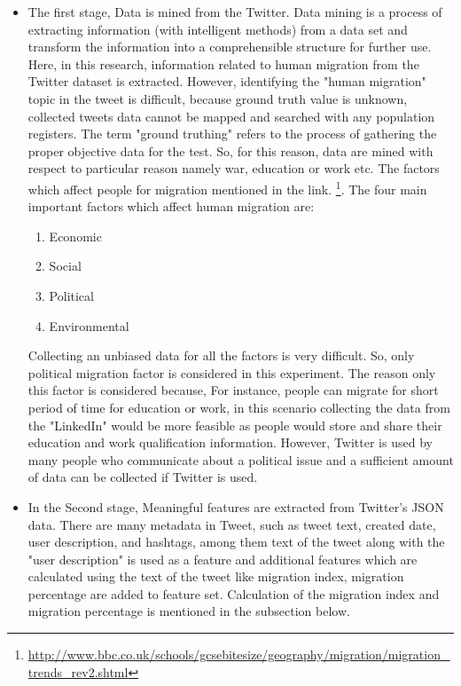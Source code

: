 \begin{itemize}
  \item  The first stage, Data is mined from the Twitter. Data mining is a process of extracting information (with intelligent methods) from a data set and transform the information into a comprehensible structure for further use. Here, in this research, information related to human migration from the Twitter dataset is extracted. However, identifying the "human migration" topic in the tweet is difficult, because ground truth value is unknown, collected tweets data cannot be mapped and searched with any population registers. The term "ground truthing" refers to the process of gathering the proper objective data for the test. So, for this reason, data are mined with respect to particular reason namely war, education or work etc. The factors which affect people for migration mentioned in the link.  \footnote{\url{http://www.bbc.co.uk/schools/gcsebitesize/geography/migration/migration_trends_rev2.shtml}  }. The four main important factors which affect human migration are:


\begin{enumerate}
    \item Economic
  \item Social
    \item Political
  \item Environmental
\end{enumerate}
Collecting an unbiased data for all the factors is very difficult. So, only political migration factor is considered in this experiment. The reason only this factor is considered because,  For instance, people can migrate for short period of time for education or work, in this scenario collecting the data from the "LinkedIn" would be more feasible as people would store and share their education and work qualification information. However, Twitter is used by many people who communicate about a political issue and a sufficient amount of data can be collected if Twitter is used.
  
  \item In the Second stage, Meaningful features are extracted from Twitter's JSON data. There are many metadata in Tweet, such as tweet text, created date, user description, and hashtags, among them text of the tweet along with the "user description" is used as a feature and additional features which are calculated using the text of the tweet like migration index, migration percentage are added to feature set. Calculation of the migration index and migration percentage is mentioned in the subsection below.
  

\end{itemize}
